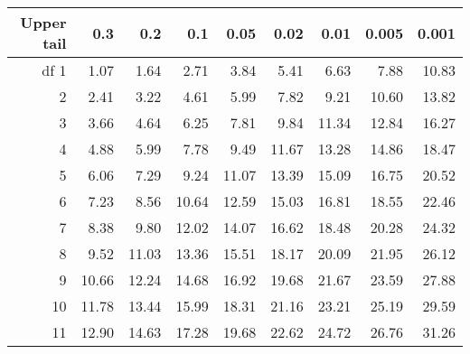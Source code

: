 \begin{center}
\begin{tabular}{r | rrrr | rrrr |}
  \hline
Upper tail & 0.3 & 0.2 & 0.1 & 0.05 & 0.02 & 0.01 & 0.005 & 0.001 \\ 
  \hline
df \hfill 1 & \footnotesize 1.07 & \footnotesize 1.64 & \footnotesize 2.71 & \footnotesize 3.84 & \footnotesize 5.41 & \footnotesize 6.63 & \footnotesize 7.88 & \footnotesize 10.83 \\ 
  2 & \footnotesize 2.41 & \footnotesize 3.22 & \footnotesize 4.61 & \footnotesize 5.99 & \footnotesize 7.82 & \footnotesize 9.21 & \footnotesize 10.60 & \footnotesize 13.82 \\ 
  3 & \footnotesize 3.66 & \footnotesize 4.64 & \footnotesize 6.25 & \footnotesize 7.81 & \footnotesize 9.84 & \footnotesize 11.34 & \footnotesize 12.84 & \footnotesize 16.27 \\ 
  4 & \footnotesize 4.88 & \footnotesize 5.99 & \footnotesize 7.78 & \footnotesize 9.49 & \footnotesize 11.67 & \footnotesize 13.28 & \footnotesize 14.86 & \footnotesize 18.47 \\ 
  5 & \footnotesize 6.06 & \footnotesize 7.29 & \footnotesize 9.24 & \footnotesize 11.07 & \footnotesize 13.39 & \footnotesize 15.09 & \footnotesize 16.75 & \footnotesize 20.52 \\ 
  \hline
  6 & \footnotesize 7.23 & \footnotesize 8.56 & \footnotesize 10.64 & \footnotesize 12.59 & \footnotesize 15.03 & \footnotesize 16.81 & \footnotesize 18.55 & \footnotesize 22.46 \\ 
  7 & \footnotesize 8.38 & \footnotesize 9.80 & \footnotesize 12.02 & \footnotesize 14.07 & \footnotesize 16.62 & \footnotesize 18.48 & \footnotesize 20.28 & \footnotesize 24.32 \\ 
  8 & \footnotesize 9.52 & \footnotesize 11.03 & \footnotesize 13.36 & \footnotesize 15.51 & \footnotesize 18.17 & \footnotesize 20.09 & \footnotesize 21.95 & \footnotesize 26.12 \\ 
  9 & \footnotesize 10.66 & \footnotesize 12.24 & \footnotesize 14.68 & \footnotesize 16.92 & \footnotesize 19.68 & \footnotesize 21.67 & \footnotesize 23.59 & \footnotesize 27.88 \\ 
  10 & \footnotesize 11.78 & \footnotesize 13.44 & \footnotesize 15.99 & \footnotesize 18.31 & \footnotesize 21.16 & \footnotesize 23.21 & \footnotesize 25.19 & \footnotesize 29.59 \\ 
  \hline
  11 & \footnotesize \footnotesize 12.90 & \footnotesize 14.63 & \footnotesize 17.28 & \footnotesize 19.68 & \footnotesize 22.62 & \footnotesize 24.72 & \footnotesize 26.76 & \footnotesize 31.26 \\ 

\end{tabular}
\end{center}
